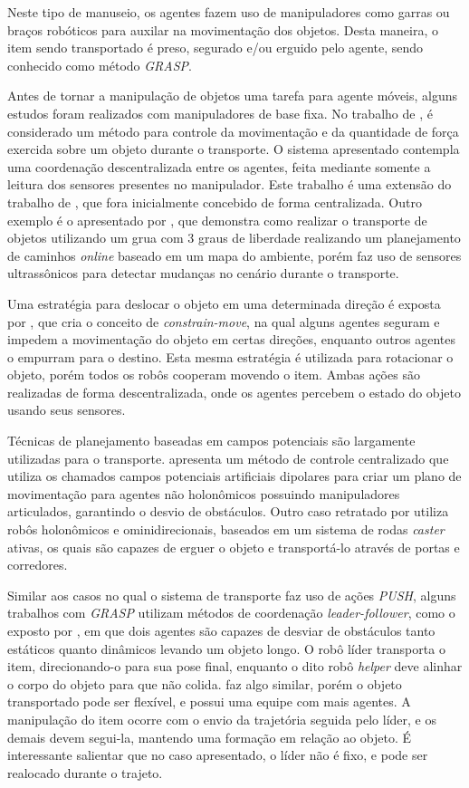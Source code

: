 Neste tipo de manuseio, os agentes fazem uso de manipuladores como garras ou braços robóticos para auxilar na movimentação dos objetos. Desta maneira, o item sendo transportado é preso, segurado e/ou erguido pelo agente, sendo conhecido como método \emph{GRASP}.

Antes de tornar a manipulação de objetos uma tarefa para agente móveis, alguns estudos foram realizados com manipuladores de base fixa. No trabalho de \cite{Montemayor2005}, é considerado um método para controle da movimentação e da quantidade de força exercida sobre um objeto durante o transporte. O sistema apresentado contempla uma coordenação descentralizada entre os agentes, feita mediante somente a leitura dos sensores presentes no manipulador. Este trabalho é uma extensão do trabalho de \cite{Wen1992}, que fora inicialmente concebido de forma centralizada. Outro exemplo é o apresentado por \cite{Nagai2011}, que demonstra como realizar o transporte de objetos utilizando um grua com 3 graus de liberdade realizando um planejamento de caminhos \emph{online} baseado em um mapa do ambiente, porém faz uso de sensores ultrassônicos para detectar mudanças no cenário durante o transporte.

Uma estratégia para deslocar o objeto em uma determinada direção é exposta por \cite{Ahmadabadi2001}, que cria o conceito de \emph{constrain-move}, na qual alguns agentes seguram e impedem a movimentação do objeto em certas direções, enquanto outros agentes o empurram para o destino. Esta mesma estratégia é utilizada para rotacionar o objeto, porém todos os robôs cooperam movendo o item. Ambas ações são realizadas de forma descentralizada, onde os agentes percebem o estado do objeto usando seus sensores.

Técnicas de planejamento baseadas em campos potenciais são largamente utilizadas para o transporte. \cite{Tanner2003} apresenta um método de controle centralizado que utiliza os chamados campos potenciais artificiais dipolares para criar um plano de movimentação para agentes não holonômicos possuindo manipuladores articulados, garantindo o desvio de obstáculos.
Outro caso retratado por \cite{Wada2013} utiliza robôs holonômicos e ominidirecionais, baseados em um sistema de rodas \emph{caster} ativas, os quais são capazes de erguer o objeto e transportá-lo através de portas e corredores.

Similar aos casos no qual o sistema de transporte faz uso de ações \emph{PUSH}, alguns trabalhos com \emph{GRASP} utilizam métodos de coordenação \emph{leader-follower}, como o exposto por \cite{Machado2013}, em que dois agentes são capazes de desviar de obstáculos tanto estáticos quanto dinâmicos levando um objeto longo. O robô líder transporta o item, direcionando-o para sua pose final, enquanto o dito robô \emph{helper} deve alinhar o corpo do objeto para que não colida. \cite{Sugar2002} faz algo similar, porém o objeto transportado pode ser flexível, e possui uma equipe com mais agentes. A manipulação do item ocorre com o envio da trajetória seguida pelo líder, e os demais devem segui-la, mantendo uma formação em relação ao objeto. É interessante salientar que no caso apresentado, o líder não é fixo, e pode ser realocado durante o trajeto.

